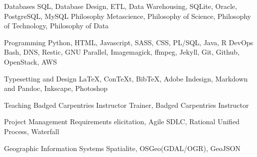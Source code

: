 

\begin{cvskills}

  \cvskill
    {Databases} %
    {SQL, Database Design,  ETL, Data Warehousing, SQLite,  Oracle, PostgreSQL, MySQL} %
  \cvskill
    {Philosophy} %
    {Metascience, Philosophy of Science, Philosophy of Technology, Philosophy of Data} %


  \cvskill
    {Programming} %
    {Python, HTML, Javascript, SASS, CSS, PL/SQL, Java, R } %
  \cvskill
    {DevOps} %
    {Bash, DNS, Restic, GNU Parallel, Imagemagick, ffmpeg, Jekyll, Git, Github, OpenStack, AWS} %
        
 \cvskill
    {Typesetting and Design} %
    {\LaTeX, Con\TeX{}t, Bib\TeX, Adobe Indesign, Markdown and Pandoc, Inkscape, Photoshop} %
    
  \cvskill
    {Teaching} %
    {Badged Carpentries Instructor Trainer, Badged Carpentries Instructor} %

  \cvskill
    {Project Management} %
    {Requirements elicitation, Agile SDLC, Rational Unified Process, Waterfall } %
    
 

 
 \cvskill
    {Geographic Information Systems} %
    {Spatialite, OSGeo(GDAL/OGR), GeoJSON} 
        
\end{cvskills}

